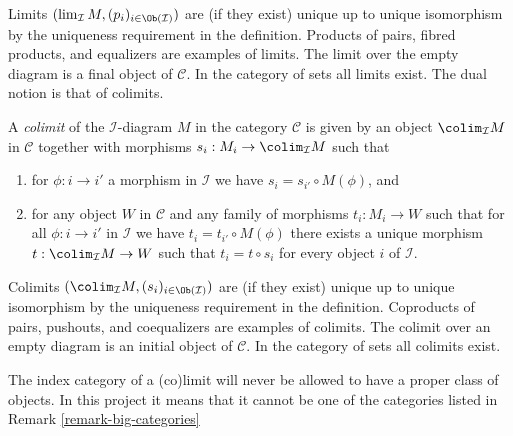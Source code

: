 \noindent
Limits $(\lim_\mathcal{I} M, (p_i)_{i\in \Ob(\mathcal{I})})$ are
(if they exist)
unique up to unique isomorphism by the uniqueness requirement
in the definition. Products of pairs, fibred products, and equalizers are
examples of limits. The limit over the empty diagram is a final object
of $\mathcal{C}$.
In the category of sets all limits exist.
The dual notion is that of colimits.

\begin{definition}
\label{definition-colimit}
A {\it colimit} of the $\mathcal{I}$-diagram $M$ in the category
$\mathcal{C}$ is given by an object $\colim_\mathcal{I} M$ in $\mathcal{C}$
together with morphisms $s_i : M_i \to \colim_\mathcal{I} M$ such that
\begin{enumerate}
\item for $\phi : i \to i'$ a morphism
in $\mathcal{I}$ we have $s_i = s_{i'} \circ M(\phi)$, and
\item for any object $W$ in $\mathcal{C}$ and any family of
morphisms $t_i : M_i \to W$ such that for all $\phi : i \to i'$
in $\mathcal{I}$ we have $t_i = t_{i'} \circ M(\phi)$ there
exists a unique morphism $t : \colim_\mathcal{I} M \to W$ such that
$t_i = t \circ s_i$ for every object $i$ of $\mathcal{I}$.
\end{enumerate}
\end{definition}

\noindent
Colimits $(\colim_\mathcal{I} M, (s_i)_{i\in \Ob(\mathcal{I})})$ are
(if they exist) unique up to unique isomorphism by the uniqueness requirement
in the definition. Coproducts of pairs, pushouts, and coequalizers are
examples of colimits. The colimit over an empty diagram is an initial object
of $\mathcal{C}$. In the category of sets all colimits exist.

\begin{remark}
\label{remark-diagram-small}
The index category of a (co)limit will never be allowed to have
a proper class of objects. In this project it means that
it cannot be one of the categories listed in
Remark \ref{remark-big-categories}
\end{remark}

